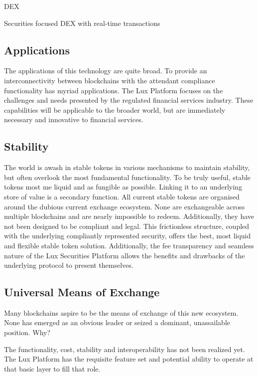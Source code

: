 \documentclass[11pt]{article}
\begin{document}
DEX


Securities focused DEX with real-time transactions


\subsection{Applications}

The applications of this technology are quite broad. To provide an interconnectivity between blockchains with the attendant compliance functionality has myriad applications. The Lux Platform focuses on the challenges and needs presented by the regulated financial services industry. These capabilities will be applicable to the broader world, but are immediately necessary and innovative to financial services.


\subsection{Stability}

The world is awash in stable tokens in various mechanisms to maintain stability, but often overlook the most fundamental functionality. To be truly useful, stable tokens most me liquid and as fungible as possible. Linking it to an underlying store of value is a secondary function. All current stable tokens are organised around the dubious current exchange ecosystem. None are exchangeable across multiple blockchains and are nearly impossible to redeem. Additionally, they have not been designed to be compliant and legal. This frictionless structure, coupled with the underlying compliantly represented security, offers the best, most liquid and flexible stable token solution. Additionally, the fee transparency and seamless nature of the Lux Securities Platform allows the benefits and drawbacks of the underlying protocol to present themselves.


\subsection{Universal Means of Exchange}

Many blockchains aspire to be the means of exchange of this new ecosystem. None has emerged as an obvious leader or seized a dominant, unassailable position. Why?


The functionality, cost, stability and interoperability has not been realized yet. The Lux Platform has the requisite feature set and potential ability to operate at that basic layer to fill that role.
\end{document}

